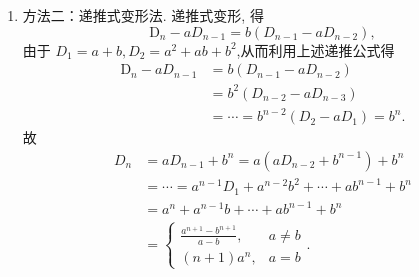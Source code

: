 \documentclass[UTF8,12pt,a4paper,fontset=fandol]{ctexart}
\begin{document}
\begin{solve}
\begin{enumerate}
                \item 方法二：递推式变形法. 递推式变形, 得
                        \[\mathrm{D}_{n}-a D_{n-1}=b\left(D_{n-1}-a D_{n-2}\right),\]
                        由于 $D_{1}=a+b, D_{2}=a^{2}+a b+b^{2}$,从而利用上述递推公式得
                        \begin{align*}
                            \mathrm{D}_{n}-a D_{n-1} & =b\left(D_{n-1}-a D_{n-2}\right)                \\
                                                    & =b^{2}\left(D_{n-2}-a D_{n-3}\right)            \\
                                                    & =\cdots=b^{n-2}\left(D_{2}-a D_{1}\right)=b^{n}.
                        \end{align*}
                        故\begin{align*}
                            D_{n} & =a D_{n-1}+b^{n}=a\left(a D_{n-2}+b^{n-1}\right)+b^{n}     \\
                                  & =\cdots=a^{n-1} D_{1}+a^{n-2} b^{2}+\cdots+a b^{n-1}+b^{n} \\
                                  & =a^{n}+a^{n-1} b+\cdots+a b^{n-1}+b^{n}                    \\
                                  & =\begin{cases}
                                        \displaystyle\frac{a^{n+1}-b^{n+1}}{a-b}, & a\neq b \\
                                        (n+1)a^n,                                 & a=b
                                     \end{cases}.
                        \end{align*}
            \end{enumerate}
\end{solve}
\end{document}
